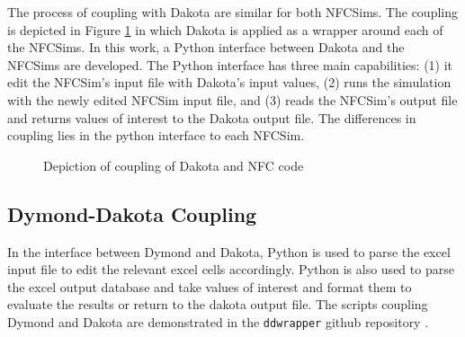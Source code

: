 The process of coupling with Dakota are similar 
for both \glspl{NFCSim}. 
The coupling is depicted in Figure \ref{fig:dakota-NFC-flow} in which 
Dakota is applied as a wrapper around each of the \glspl{NFCSim}. 
In this work, a Python interface between Dakota and the \glspl{NFCSim}
are developed. 
The Python interface has three main capabilities: 
(1) it edit the \gls{NFCSim}'s input file with Dakota's input values, 
(2) runs the simulation with the newly edited \gls{NFCSim} input file, and 
(3) reads the \gls{NFCSim}'s output file and returns values of interest 
to the Dakota output file. 
The differences in coupling lies in the python interface to each 
\gls{NFCSim}. 

\begin{figure}[]
    \centering
    \caption{Depiction of coupling of Dakota and NFC code}
    \label{fig:dakota-NFC-flow}
\end{figure}

\subsection{Dymond-Dakota Coupling}
In the interface between Dymond and Dakota, Python is used 
to parse the excel input file to edit the relevant 
excel cells accordingly. 
Python is also used to parse the excel output database and take 
values of interest and format them to evaluate the results 
or return to the dakota output file.
The scripts coupling Dymond and Dakota are demonstrated in the 
\texttt{ddwrapper} github repository \cite{ddwrapper_doi_2019}.

